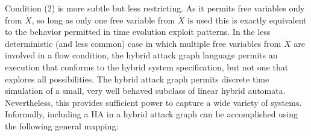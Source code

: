 Condition (2) is more subtle but less restricting. As it permits free
variables only from $\dot{X}$, so long as only one free variable from $\dot{X}$ is
used this is exactly equivalent to the behavior permitted in time evolution
exploit patterns. In the less deterministic (and less common) case in which
multiple free variables from $\dot{X}$ are involved in a flow condition,
the hybrid attack graph language permits an execution that conforms to the
hybrid system specification, but not one that explores all possibilities.
The hybrid attack graph permits discrete time
simulation of a small, very well behaved subclass of linear hybrid automata.
Nevertheless, this provides sufficient power to capture a wide variety of
systems. Informally, including a HA in a hybrid attack graph can be 
accomplished using the following general mapping:
